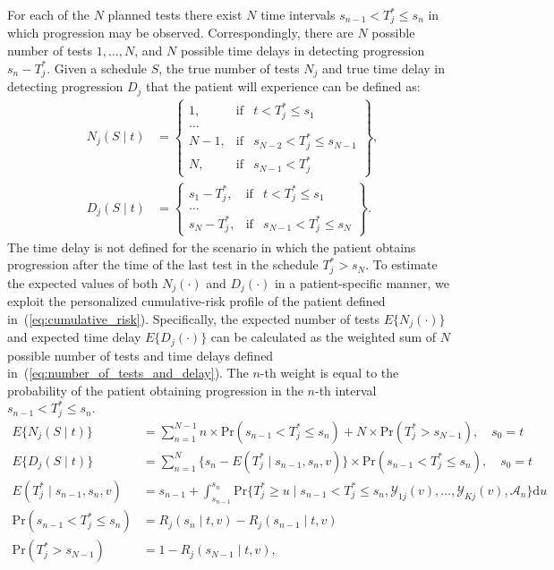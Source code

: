 For each of the $N$ planned tests there exist $N$ time intervals ${s_{n-1} < T^*_j \leq s_n}$ in which progression may be observed. Correspondingly, there are $N$ possible number of tests $1,\ldots, N$, and $N$ possible time delays in detecting progression $s_n - T^*_j$. Given a schedule $S$, the true number of tests $N_j$ and true time delay in detecting progression $D_j$ that the patient will experience can be defined as:
\begin{equation}
\label{eq:number_of_tests_and_delay}
\begin{split}
N_j (S \mid t) &= \left\{ \begin{array}{lcr}
  1, &\mbox{if}& t < T^*_j \leq s_1\\
  \ldots \\
  N-1, &\mbox{if}& s_{N-2} < T^*_j \leq s_{N-1}\\
  N, &\mbox{if}& s_{N-1} < T^*_j  
\end{array} \right\},\\
D_j (S \mid t) &= \left\{ \begin{array}{lcrr}
  s_1 - T^*_j, &\mbox{if}& t < T^*_j \leq s_1\\
  \ldots \\
  s_N - T^*_j, &\mbox{if}& s_{N-1} < T^*_j \leq s_N  
\end{array} \right\}.
\end{split}
\end{equation}
The time delay is not defined for the scenario in which the patient obtains progression after the time of the last test in the schedule $T^*_j > s_N$. To estimate the expected values of both $N_j(\cdot)$ and $D_j(\cdot)$ in a patient-specific manner, we exploit the personalized cumulative-risk profile of the patient defined in~(\ref{eq:cumulative_risk}). Specifically, the expected number of tests $E\{N_j(\cdot)\}$ and expected time delay $E\{D_j(\cdot)\}$ can be calculated as the weighted sum of $N$ possible number of tests and time delays defined in~(\ref{eq:number_of_tests_and_delay}). The $n$-th weight is equal to the probability of the patient obtaining progression in the $n$-th interval ${s_{n-1} < T^*_j \leq s_n}$.
\begin{equation}
\label{eq:expected_number_of_tests_and_delay}
\begin{split}
E\big\{N_j(S \mid t)\big\} &= \sum_{n=1}^{N-1} n \times \mbox{Pr}(s_{n-1} < T^*_j \leq s_n) + N \times \mbox{Pr}(T^*_j > s_{N-1}), \quad s_0 = t\\
E\big\{D_j(S \mid t)\big\} &= \sum_{n=1}^{N} \Big\{s_n - E(T^*_j \mid s_{n-1}, s_n, v)\Big\} \times \mbox{Pr}(s_{n-1} < T^*_j \leq s_n) , \quad s_0 = t\\
E(T^*_j \mid s_{n-1}, s_n, v) &= s_{n-1} + \int_{s_{n-1}}^{s_n} \mbox{Pr}\Big\{T^*_j \geq u \mid s_{n-1} < T^*_j \leq s_n, \mathcal{Y}_{1j}(v), \ldots, \mathcal{Y}_{Kj}(v), \mathcal{A}_n\Big\} \mathrm{d}u\\
\mbox{Pr}(s_{n-1} < T^*_j \leq s_n) &= R_j(s_n \mid t, v) - R_j(s_{n-1} \mid t, v)\\
\mbox{Pr}(T^*_j > s_{N-1}) &= 1- R_j(s_{N-1} \mid t, v),
\end{split}
\end{equation}
